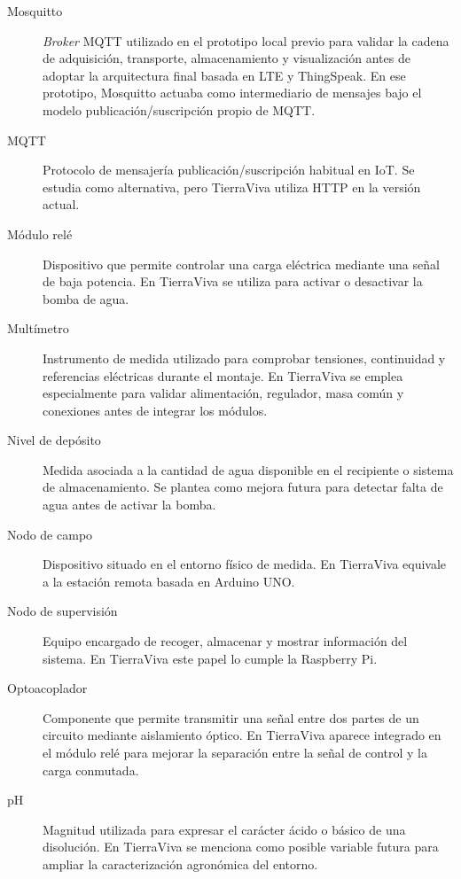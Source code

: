 \begin{description}
    \item[Mosquitto]
    \textit{Broker} MQTT utilizado en el prototipo local previo para validar la cadena de adquisición, transporte, almacenamiento y visualización antes de adoptar la arquitectura final basada en LTE y ThingSpeak. En ese prototipo, Mosquitto actuaba como intermediario de mensajes bajo el modelo publicación/suscripción propio de MQTT.

    \item[MQTT]
    Protocolo de mensajería publicación/suscripción habitual en IoT. Se estudia como alternativa, pero TierraViva utiliza HTTP en la versión actual.

    \item[Módulo relé]
    Dispositivo que permite controlar una carga eléctrica mediante una señal de baja potencia. En TierraViva se utiliza para activar o desactivar la bomba de agua.
    
    \item[Multímetro]
    Instrumento de medida utilizado para comprobar tensiones, continuidad y referencias eléctricas durante el montaje. En TierraViva se emplea especialmente para validar alimentación, regulador, masa común y conexiones antes de integrar los módulos.

    \item[Nivel de depósito]
    Medida asociada a la cantidad de agua disponible en el recipiente o sistema de almacenamiento. Se plantea como mejora futura para detectar falta de agua antes de activar la bomba.

    \item[Nodo de campo]
    Dispositivo situado en el entorno físico de medida. En TierraViva equivale a la estación remota basada en Arduino UNO.

    \item[Nodo de supervisión]
    Equipo encargado de recoger, almacenar y mostrar información del sistema. En TierraViva este papel lo cumple la Raspberry Pi.

    \item[Optoacoplador]
    Componente que permite transmitir una señal entre dos partes de un circuito mediante aislamiento óptico. En TierraViva aparece integrado en el módulo relé para mejorar la separación entre la señal de control y la carga conmutada.

    \item[pH]
    Magnitud utilizada para expresar el carácter ácido o básico de una disolución. En TierraViva se menciona como posible variable futura para ampliar la caracterización agronómica del entorno.


\end{description}
